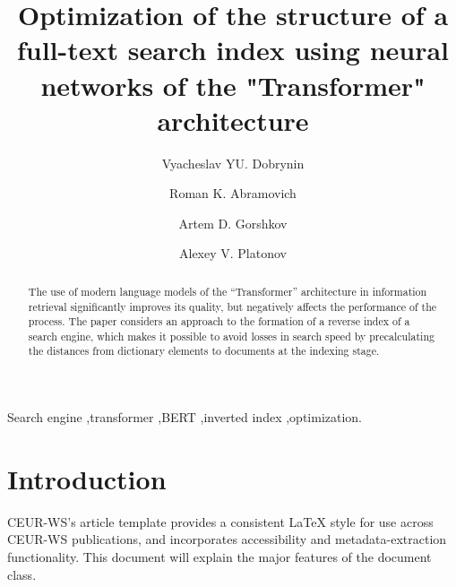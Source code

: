 \documentclass[
    twocolumn,
]{template/ceurart}
\begin{document}
    \title{Optimization of the structure of a full-text search index using neural networks of the "Transformer" architecture}
    \author[1]{Vyacheslav YU. Dobrynin}
    \author[1]{Roman K. Abramovich}
    \author[1]{Artem D. Gorshkov}
    \author[1]{Alexey V. Platonov}
    \address[1]{ITMO University, Kronverksky Pr. 49, bldg. A, Saint-Petersburg, 197101, Russian Federation}
    \begin{abstract}
        The use of modern language models of the ``Transformer'' architecture in information retrieval significantly
        improves its quality, but negatively affects the performance of the process.
        The paper considers an approach to the formation of a reverse index of a search engine,
        which makes it possible to avoid losses in search speed by precalculating the distances from dictionary
        elements to documents at the indexing stage.
    \end{abstract}
    \begin{keywords}
        Search engine \sep transformer \sep BERT \sep inverted index \sep optimization.
    \end{keywords}
    \maketitle


    \section{Introduction}
    CEUR-WS's article template provides a consistent \LaTeX{} style for
    use across CEUR-WS publications, and incorporates accessibility and
    metadata-extraction functionality.
    This document will explain the
    major features of the document class.
\end{document}
